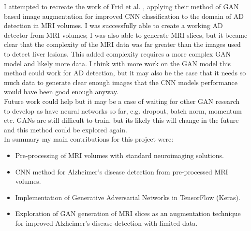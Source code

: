 \documentclass[
    author={Kai Hulme},
    supervisor={Dr Jon Bird},
    degree={BSc},
    title={Generative Adversarial Networks as an Augmentation Technique},
    subtitle={for Alzheimer's Disease Detection in MRI Volumes},
    type={Research},
    year={2021} 
]{dissertation}
\begin{document}
I attempted to recreate the work of Frid et al. \cite{frid2018gan}, applying their method of GAN based image augmentation for improved CNN classification to the domain of AD detection in MRI volumes. I was successfully able to create a working AD detector from MRI volumes; I was also able to generate MRI slices, but it became clear that the complexity of the MRI data was far greater than the images used to detect liver lesions. This added complexity requires a more complex GAN model and likely more data. I think with more work on the GAN model this method could work for AD detection, but it may also be the case that it needs so much data to generate clear enough images that the CNN models performance would have been good enough anyway. \\

Future work could help but it may be a case of waiting for other GAN research to develop as have neural networks so far, e.g. dropout, batch norm, momentum etc. GANs are still difficult to train, but its likely this will change in the future and this method could be explored again. \\

In summary my main contributions for this project were:

\begin{itemize}
\item Pre-processing of MRI volumes with standard neuroimaging solutions.
\item CNN method for Alzheimer's disease detection from pre-processed MRI volumes.
\item Implementation of Generative Adversarial Networks in TensorFlow (Keras).
\item Exploration of GAN generation of MRI slices as an augmentation technique for improved Alzheimer's disease detection with limited data.
\end{itemize}




\backmatter

\nocite{*}

\printbibliography


\end{document}
